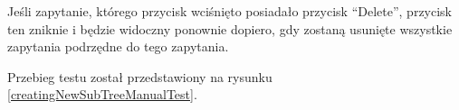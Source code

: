 \begin{enumerate}
\begin{enumerate}
                Jeśli zapytanie, którego przycisk wciśnięto posiadało przycisk
                ``Delete'', przycisk ten zniknie i będzie widoczny ponownie
                dopiero, gdy zostaną usunięte wszystkie zapytania podrzędne do
                tego zapytania.

                Przebieg testu został przedstawiony na rysunku \ref{creatingNewSubTreeManualTest}.

                \begin{figure}[h]
                    \centering




\end{figure}
\end{enumerate}
\end{enumerate}

